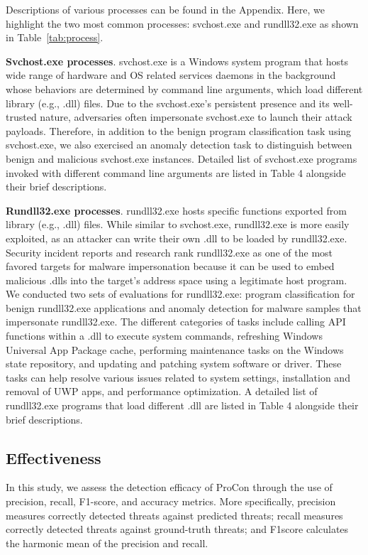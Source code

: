 Descriptions of various processes can be found in the Appendix. Here, we highlight the two most common processes: svchost.exe and rundll32.exe as shown in Table~\ref{tab:process}.

\textbf{Svchost.exe processes}. svchost.exe is a Windows system program that hosts wide range of hardware and OS related services daemons in the background whose behaviors are determined by command line arguments, which load different library (e.g., .dll) files. Due to the svchost.exe’s persistent presence and its well-trusted nature, adversaries often impersonate svchost.exe to launch their attack payloads. Therefore, in addition to the benign program classification task using svchost.exe, we also exercised an anomaly detection task to distinguish between benign and malicious svchost.exe instances. Detailed list of svchost.exe programs invoked with different command line arguments are listed in Table 4 alongside their brief descriptions.

\textbf{Rundll32.exe processes}. rundll32.exe hosts specific functions exported from library (e.g., .dll) files. While similar to svchost.exe, rundll32.exe is more easily exploited, as an attacker can write their own .dll to be loaded by rundll32.exe. Security incident reports and research rank rundll32.exe as one of the most favored targets for malware impersonation because it can be used to embed malicious .dlls into the target’s address space using a legitimate host program. We conducted two sets of evaluations for rundll32.exe: program classification for benign rundll32.exe applications and anomaly detection for malware samples that impersonate rundll32.exe. The different categories of tasks include calling API functions within a .dll to execute system commands, refreshing Windows Universal App Package cache, performing maintenance tasks on the Windows state repository, and updating and patching system software or driver. These tasks can help resolve various issues related to system settings, installation and removal of UWP apps, and performance optimization. A detailed list of rundll32.exe programs that load different .dll are listed in Table 4 alongside their brief descriptions.


\subsection{Effectiveness}
\label{sec-effective}
In this study, we assess the detection efficacy of ProCon through the use of precision, recall, F1-score, and accuracy metrics. More specifically, precision measures correctly detected threats against predicted threats; recall measures correctly detected threats against ground-truth threats; and F1score calculates the harmonic mean of the precision and recall.

